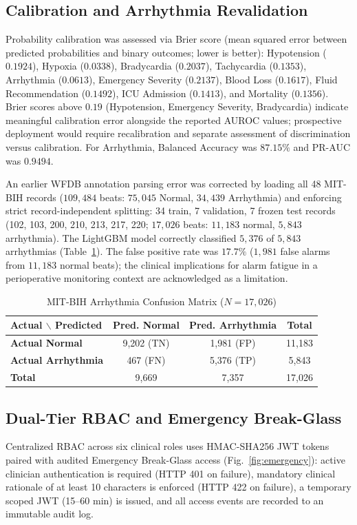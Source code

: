 \documentclass[conference]{IEEEtran}
\begin{document}
\subsection{Calibration and Arrhythmia Revalidation}
Probability calibration was assessed via Brier score (mean squared error between predicted probabilities and binary outcomes; lower is better): Hypotension ($0.1924$), Hypoxia ($0.0338$), Bradycardia ($0.2037$), Tachycardia ($0.1353$), Arrhythmia ($0.0613$), Emergency Severity ($0.2137$), Blood Loss ($0.1617$), Fluid Recommendation ($0.1492$), ICU Admission ($0.1413$), and Mortality ($0.1356$). Brier scores above $0.19$ (Hypotension, Emergency Severity, Bradycardia) indicate meaningful calibration error alongside the reported AUROC values; prospective deployment would require recalibration and separate assessment of discrimination versus calibration. For Arrhythmia, Balanced Accuracy was $87.15\%$ and PR-AUC was $0.9494$.

An earlier WFDB annotation parsing error was corrected by loading all 48 MIT-BIH records ($109{,}484$ beats: $75{,}045$ Normal, $34{,}439$ Arrhythmia) and enforcing strict record-independent splitting: 34 train, 7 validation, 7 frozen test records (102, 103, 200, 210, 213, 217, 220; $17{,}026$ beats: $11{,}183$ normal, $5{,}843$ arrhythmia). The LightGBM model correctly classified $5{,}376$ of $5{,}843$ arrhythmias (Table~\ref{tab:cm}). The false positive rate was $17.7\%$ ($1{,}981$ false alarms from $11{,}183$ normal beats); the clinical implications for alarm fatigue in a perioperative monitoring context are acknowledged as a limitation.

\begin{table}[h]
\centering
\caption{MIT-BIH Arrhythmia Confusion Matrix ($N = 17{,}026$)}
\label{tab:cm}
\begin{tabular}{lccc}
\toprule
\textbf{Actual $\backslash$ Predicted} & \textbf{Pred. Normal} & \textbf{Pred. Arrhythmia} & \textbf{Total} \\
\midrule
\textbf{Actual Normal} & 9,202 (TN) & 1,981 (FP) & 11,183 \\
\textbf{Actual Arrhythmia} & 467 (FN) & 5,376 (TP) & 5,843 \\
\midrule
\textbf{Total} & 9,669 & 7,357 & 17,026 \\
\bottomrule
\end{tabular}
\end{table}

\subsection{Dual-Tier RBAC and Emergency Break-Glass}
Centralized RBAC across six clinical roles uses HMAC-SHA256 JWT tokens paired with audited Emergency Break-Glass access (Fig.~\ref{fig:emergency}): active clinician authentication is required (HTTP 401 on failure), mandatory clinical rationale of at least 10 characters is enforced (HTTP 422 on failure), a temporary scoped JWT (15--60 min) is issued, and all access events are recorded to an immutable audit log.
\end{document}
